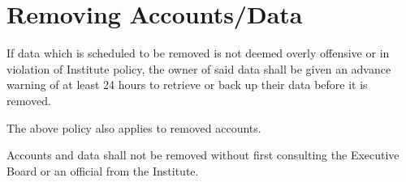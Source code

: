 \section{Removing Accounts/Data}
\begin{subroutines}
\item If data which is scheduled to be removed is not deemed overly offensive or in violation of Institute policy, the owner of said data shall be given an advance warning of at least 24 hours to retrieve or back up their data before it is removed.
\item The above policy also applies to removed accounts.
\item Accounts and data shall not be removed without first consulting the Executive Board or an official from the Institute.
\end{subroutines}



